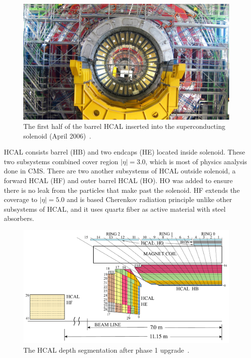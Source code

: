 \begin{figure}[!ht]
  \centering
  \includegraphics[width=\textwidth]{figures/cms_hcal_hb_inserted.jpg}
  \caption[The first half of the barrel \gls{HCAL} inserted into the
    superconducting solenoid (April 2006)]%
  {The first half of the barrel \gls{HCAL} inserted into the
    superconducting solenoid (April 2006)~\cite{image-cms-hcal-inserted}.}%
  \label{fig:cms-hcal-inserted}
\end{figure}

\gls{HCAL} consists barrel (HB) and two endcaps (HE) located inside solenoid.
These two subsystems combined cover region \( |\eta| = 3.0 \), which
is most of physics analysis done in \gls{CMS}.
There are two another subsystems of \gls{HCAL} outside solenoid,
a forward \gls{HCAL} (HF) and outer barrel \gls{HCAL} (HO).
HO was added to ensure there is no leak from the particles that
make past the solenoid. HF extends the coverage
to \(|\eta| = 5.0\) and is based Cherenkov radiation principle unlike
other subsystems of \gls{HCAL}, and it uses quartz fiber
as active material with steel absorbers.

\begin{figure}[!ht]
  \centering
  \includegraphics[width=\textwidth]{figures/cms_hcal_depth_seg.pdf}
  \caption[The \gls{HCAL} depth segmentation after phase 1 upgrade]%
  {The \gls{HCAL} depth segmentation after phase 1 upgrade~\cite{image-cms-hcal-depth}.}%
  \label{fig:cms-hcal-depth}
\end{figure}

